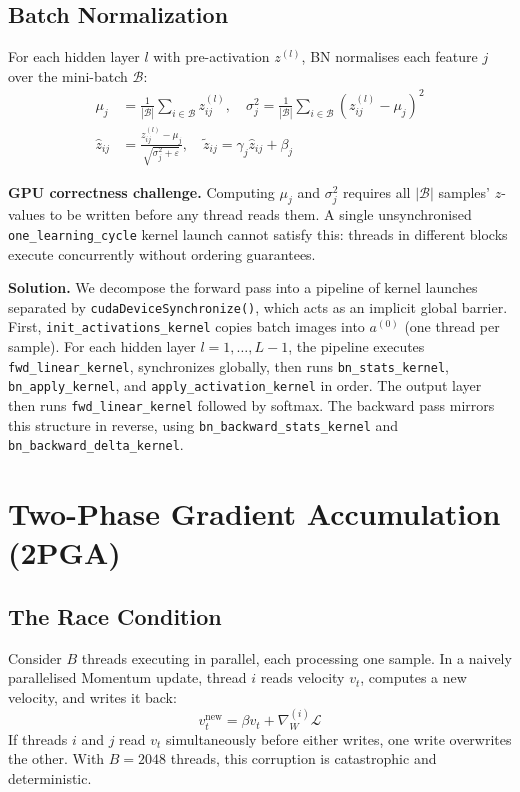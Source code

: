 \documentclass[conference]{IEEEtran}
\begin{document}
\subsection{Batch Normalization}

For each hidden layer $l$ with pre-activation $z^{(l)}$, BN normalises each feature $j$ over the mini-batch $\mathcal{B}$:
\begin{align}
\mu_j &= \frac{1}{|\mathcal{B}|}\sum_{i \in \mathcal{B}} z_{ij}^{(l)}, \quad
\sigma_j^2 = \frac{1}{|\mathcal{B}|}\sum_{i \in \mathcal{B}} (z_{ij}^{(l)} - \mu_j)^2 \\
\hat{z}_{ij} &= \frac{z_{ij}^{(l)} - \mu_j}{\sqrt{\sigma_j^2 + \varepsilon}}, \quad
\tilde{z}_{ij} = \gamma_j \hat{z}_{ij} + \beta_j
\end{align}

\textbf{GPU correctness challenge.} Computing $\mu_j$ and $\sigma_j^2$ requires all $|\mathcal{B}|$ samples' $z$-values to be written before any thread reads them. A single unsynchronised \texttt{one\_learning\_cycle} kernel launch cannot satisfy this: threads in different blocks execute concurrently without ordering guarantees.

\textbf{Solution.} We decompose the forward pass into a pipeline of kernel launches separated by \texttt{cudaDeviceSynchronize()}, which acts as an implicit global barrier. First, \texttt{init\_activations\_kernel} copies batch images into $a^{(0)}$ (one thread per sample). For each hidden layer $l=1,\ldots,L{-}1$, the pipeline executes \texttt{fwd\_linear\_kernel}, synchronizes globally, then runs \texttt{bn\_stats\_kernel}, \texttt{bn\_apply\_kernel}, and \texttt{apply\_activation\_kernel} in order. The output layer then runs \texttt{fwd\_linear\_kernel} followed by softmax. The backward pass mirrors this structure in reverse, using \texttt{bn\_backward\_stats\_kernel} and \texttt{bn\_backward\_delta\_kernel}.

\section{Two-Phase Gradient Accumulation (2PGA)}

\subsection{The Race Condition}

Consider $B$ threads executing in parallel, each processing one sample. In a naively parallelised Momentum update, thread $i$ reads velocity $v_t$, computes a new velocity, and writes it back:
\begin{equation}
v_t^{\text{new}} = \beta v_t + \nabla_W^{(i)} \mathcal{L}
\end{equation}
If threads $i$ and $j$ read $v_t$ simultaneously before either writes, one write overwrites the other. With $B=2048$ threads, this corruption is catastrophic and deterministic.
\end{document}
